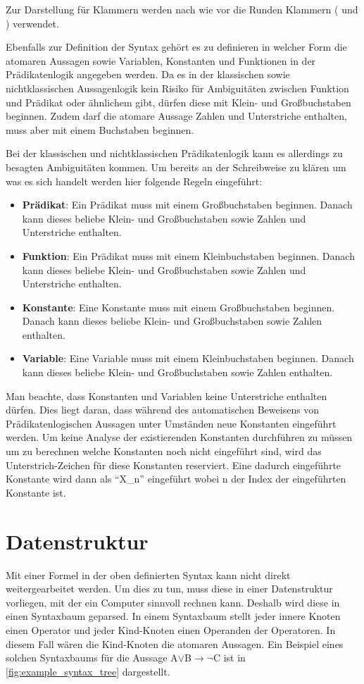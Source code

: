 Zur Darstellung für Klammern werden nach wie vor die Runden Klammern ( und ) verwendet.

Ebenfalls zur Definition der Syntax gehört es zu definieren in welcher Form die atomaren Aussagen sowie Variablen, Konstanten und Funktionen in der Prädikatenlogik angegeben werden. Da es in der klassischen sowie nichtklassischen Aussagenlogik kein Risiko für Ambiguitäten zwischen Funktion und Prädikat oder ähnlichem gibt, dürfen diese mit Klein- und Großbuchstaben beginnen. Zudem darf die atomare Aussage Zahlen und Unterstriche enthalten, muss aber mit einem Buchstaben beginnen.

Bei der klassischen und nichtklassischen Prädikatenlogik kann es allerdings zu besagten Ambiguitäten kommen. Um bereits an der Schreibweise zu klären um was es sich handelt werden hier folgende Regeln eingeführt:
\begin{itemize}
\item \textbf{Prädikat}: Ein Prädikat muss mit einem Großbuchstaben beginnen. Danach kann dieses beliebe Klein- und Großbuchstaben sowie Zahlen und Unterstriche enthalten.

\item \textbf{Funktion}: Ein Prädikat muss mit einem Kleinbuchstaben beginnen. Danach kann dieses beliebe Klein- und Großbuchstaben sowie Zahlen und Unterstriche enthalten.

\item \textbf{Konstante}: Eine Konstante muss mit einem Großbuchstaben beginnen. Danach kann dieses beliebe Klein- und Großbuchstaben sowie Zahlen enthalten.

\item \textbf{Variable}: Eine Variable muss mit einem Kleinbuchstaben beginnen. Danach kann dieses beliebe Klein- und Großbuchstaben sowie Zahlen enthalten.
\end{itemize}

Man beachte, dass Konstanten und Variablen keine Unterstriche enthalten dürfen. Dies liegt daran, dass während des automatischen Beweisens von Prädikatenlogischen Aussagen unter Umständen neue Konstanten eingeführt werden. Um keine Analyse der existierenden Konstanten durchführen zu müssen um zu berechnen welche Konstanten noch nicht eingeführt sind, wird das Unterstrich-Zeichen für diese Konstanten reserviert. Eine dadurch eingeführte Konstante wird dann als ``X\_n'' eingeführt wobei n der Index der eingeführten Konstante ist.


\section{Datenstruktur}
Mit einer Formel in der oben definierten Syntax kann nicht direkt weitergearbeitet werden. Um dies zu tun, muss diese in einer Datenstruktur vorliegen, mit der ein Computer sinnvoll rechnen kann.
Deshalb wird diese in einen Syntaxbaum geparsed. In einem Syntaxbaum stellt jeder innere Knoten einen Operator und jeder Kind-Knoten einen Operanden der Operatoren. \cite{compiler_dragon_book} In diesem Fall wären die Kind-Knoten die atomaren Aussagen. Ein Beispiel eines solchen Syntaxbaums für die Aussage A$\vee$B$\rightarrow\neg$C ist in \autoref{fig:example_syntax_tree} dargestellt.


